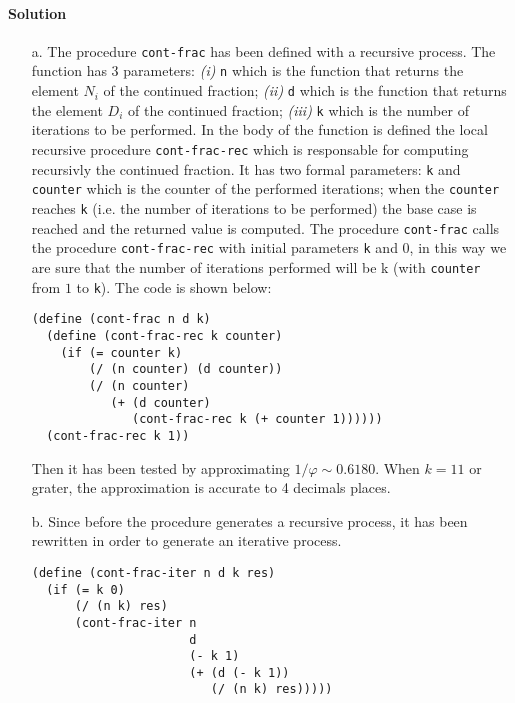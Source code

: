\paragraph{Solution}
\begin{itemize}
    \item[a.] The procedure \texttt{cont-frac} has been defined with a recursive process. The function has 3 parameters: \textit{(i)}
        \texttt{n} which is the function that returns the element $ N_{i} $ of the continued fraction; \textit{(ii)} \texttt{d}
        which is the function that returns the element $ D_{i} $ of the continued fraction; \textit{(iii)} \texttt{k} which is the
        number of iterations to be performed.
        In the body of the function is defined the local recursive procedure \texttt{cont-frac-rec} which is responsable for
        computing recursivly the continued fraction. It has two formal parameters: \texttt{k} and \texttt{counter} which is the 
        counter of the performed iterations; when the \texttt{counter} reaches \texttt{k} (i.e. the number of iterations to be
        performed) the base case is reached and the returned value is computed.
        The procedure \texttt{cont-frac} calls the procedure \texttt{cont-frac-rec} with initial parameters \texttt{k} and $ 0 $,
        in this way we are sure that the number of iterations performed will be k (with \texttt{counter} from $1$ to \texttt{k}).
        The code is shown below:
\begin{lstlisting}[caption={Recursive procedure \texttt{cont-frac}},captionpos=b]
(define (cont-frac n d k)
  (define (cont-frac-rec k counter) 
    (if (= counter k)
        (/ (n counter) (d counter))
        (/ (n counter)
           (+ (d counter) 
              (cont-frac-rec k (+ counter 1))))))
  (cont-frac-rec k 1))
\end{lstlisting}
        Then it has been tested by approximating $ 1 / \varphi \sim 0.6180 $. When $ k = 11 $ or grater, the approximation is
        accurate to 4 decimals places.
    \item[b.] Since before the procedure generates a recursive process, it has been rewritten in order to generate an iterative
        process.
\begin{lstlisting}
(define (cont-frac-iter n d k res)
  (if (= k 0)
      (/ (n k) res)
      (cont-frac-iter n 
                      d 
                      (- k 1) 
                      (+ (d (- k 1)) 
                         (/ (n k) res)))))
\end{lstlisting}   
\end{itemize}


